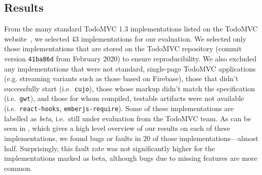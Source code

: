 \documentclass[sigplan,nonacm,10pt]{acmart}
\begin{document}
\subsection{Results}
From the many standard TodoMVC 1.3 implementations listed on the TodoMVC website~\citep{todomvc}, we selected 43 implementations for our evaluation.
We selected only those implementations that are stored on the TodoMVC repository (commit version \texttt{41ba86d} from February 2020)
to ensure reproducibility. We also excluded any implementations that were not standard, single-page TodoMVC applications (e.g. streaming variants such as those based on Firebase), those
that didn't successfully start (i.e.\ \texttt{cujo}), those whose markup didn't match the specification (i.e.\ \texttt{gwt}), and those for whom compiled, testable artifacts were not available (i.e.\ \texttt{react-hooks}, \texttt{emberjs-require}).
   Some of these implementations are labelled as \emph{beta}, i.e.\ still under evaluation from the TodoMVC team.
As can be seen in , which gives a high level overview of our results on each of these implementations, we found bugs or faults in 20 of those implementations---almost half. Surprisingly, this fault rate was not significantly higher
for the implementations marked as beta, although bugs due to missing features are more common.
\end{document}
